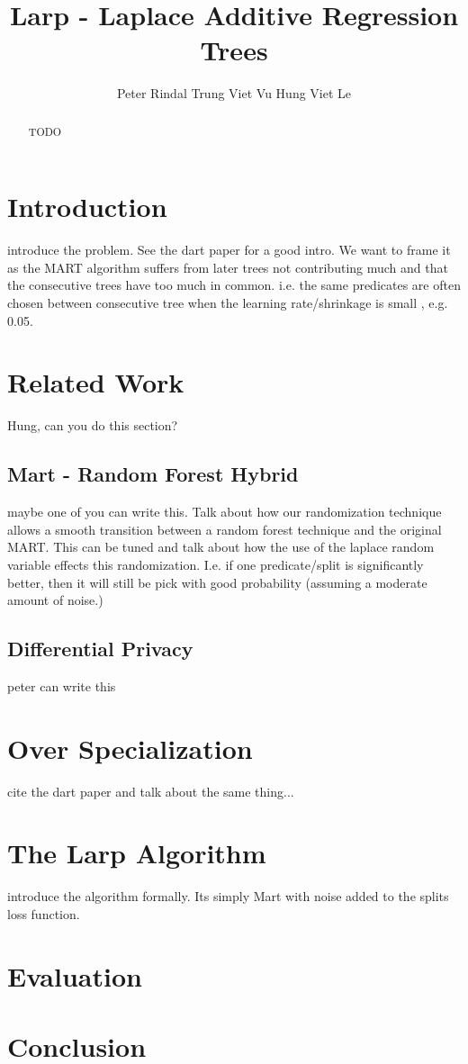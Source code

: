\documentclass{article} %
\title{Larp - Laplace Additive Regression Trees}
\author{Peter Rindal 
\And
Trung Viet Vu 
\And
Hung Viet Le}
\begin{document}
\maketitle

\begin{abstract}

TODO

\end{abstract}

\section{Introduction}

introduce the problem. See the dart paper for a good intro. We want to frame it as the MART algorithm suffers from later trees not contributing much and that the consecutive trees have too much in common. i.e. the same predicates are often chosen between consecutive tree when the learning rate/shrinkage is small , e.g. 0.05. 

\section{Related Work}

Hung, can you do this section?

\subsection{Mart - Random Forest Hybrid}



maybe one of you can write this. Talk about how our randomization technique allows a smooth transition between a random forest technique and the original MART. This can be tuned and talk about how the use of the laplace random variable effects this randomization. I.e. if one predicate/split is significantly better, then it will still be pick with good probability (assuming a moderate amount of noise.)




\subsection{Differential Privacy }

peter can write this

\section{Over Specialization}

cite the dart paper and talk about the same thing...

\section{The Larp Algorithm}

introduce the algorithm formally. Its simply Mart with noise added to the splits loss function.

\section{Evaluation}

\section{Conclusion}
\end{document}
